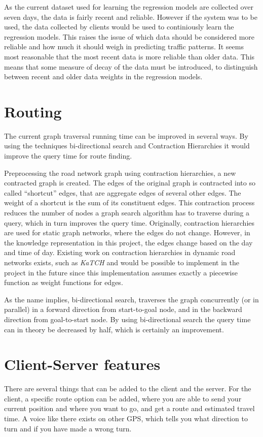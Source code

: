 As the current dataset used for learning the regression models are collected over seven days, the data is fairly recent and reliable. However if the system was to be used, the data collected by clients would be used to continiously learn the regression models. This raises the issue of which data should be considered more reliable and how much it should weigh in predicting traffic patterns. It seems most reasonable that the most recent data is more reliable than older data. This means that some measure of decay of the data must be introduced, to distinguish between recent and older data weights in the regression models.

\section{Routing}
The current graph traversal running time can be improved in several ways. By using the techniques bi-directional search and Contraction Hierarchies it would improve the query time for route finding.

Preprocessing the road network graph using contraction hierarchies, a new contracted graph is created. The edges of the original graph is contracted into so called “shortcut” edges, that are aggregate edges of  several other edges. The weight of a shortcut is the sum of its constituent edges. This contraction process reduces the number of nodes a graph search algorithm has to traverse during a query, which in turn improves the query time. 
Originally, contraction hierarchies are used for static graph networks, where the edges do not change. However, in the knowledge representation in this project, the edges change based on the day and time of day. Existing work on  contraction hierarchies in dynamic road networks exists,  such as \emph{KaTCH}\cite{KaTCH}\cite{KaTCHi} and would be possible to implement in the project in the future since this implementation assumes exactly a piecewise function as weight functions for edges.

As the name implies, bi-directional search, traverses the graph concurrently (or in parallel) in a forward direction from start-to-goal node, and in the backward direction from goal-to-start node. By using bi-directional search the query time can in theory be decreased by half, which is certainly an improvement.

\section{Client-Server features}
There are several things that can be added to the client and the server. For the client, a specific route option can be added, where you are able to send your current position and where you want to go, and get a route and estimated travel time. A voice like there exists on other GPS, which tells you what direction to turn and if you have made a wrong turn.

